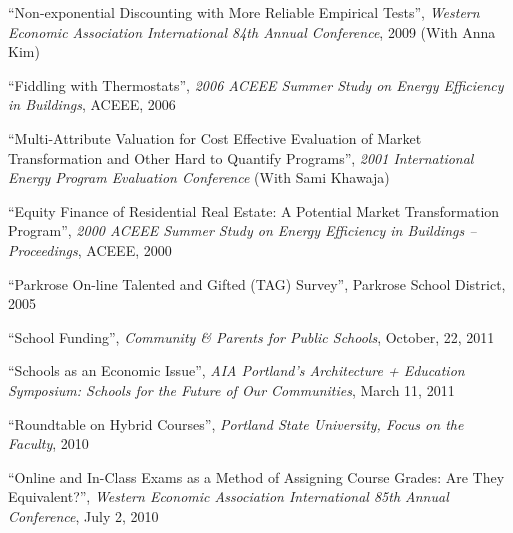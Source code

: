 \documentclass[Computer Science]{vita}
\begin{document}
\begin{vita}
\begin{Publications}
\begin{Selected Papers at Refereed Conferences}
 
    \item ``Non-exponential Discounting with More Reliable Empirical
      Tests'', \emph{Western Economic Association International 84th
        Annual Conference}, 2009 (With Anna Kim)

    \item ``Fiddling with Thermostats'', \emph{2006 ACEEE Summer Study
        on Energy Efficiency in Buildings}, ACEEE, 2006

  	
    \item ``Multi-Attribute Valuation for Cost Effective Evaluation of
      Market Transformation and Other Hard to Quantify Programs'',
      \emph{2001 International Energy Program Evaluation Conference}
      (With Sami Khawaja)
	
    \item ``Equity Finance of Residential Real Estate: A Potential
      Market Transformation Program'', \emph{2000 ACEEE Summer Study
        on Energy Efficiency in Buildings -- Proceedings}, ACEEE, 2000
    \end{Selected Papers at Refereed Conferences}
   
    \begin{Selected Unrefereed Public Reports}
    
  
    \item ``Parkrose On-line Talented and Gifted (TAG) Survey'',
      Parkrose School District, 2005

 	
    \end{Selected Unrefereed Public Reports}
  
  \end{Publications}

  \begin{Selected Presentations and Invited Talks}
  \item ``School Funding'', \emph{Community \& Parents for Public Schools}, October, 22, 2011
  
  \item ``Schools as an Economic Issue'', \emph{AIA Portland's Architecture + Education Symposium: Schools for the Future of Our Communities}, March 11, 2011

  \item ``Roundtable on Hybrid Courses'', \emph{Portland State University, Focus on the Faculty}, 2010

  \item ``Online and In-Class Exams as a Method of Assigning Course
    Grades: Are They Equivalent?'', \emph{Western Economic Association
      International 85th Annual Conference}, July 2, 2010
  

\end{Selected Presentations and Invited Talks}
\end{vita}
\end{document}
